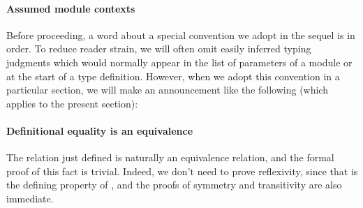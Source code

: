 \paragraph*{Assumed module contexts}
Before proceeding, a word about a special convention we adopt in the sequel is in order. To reduce reader strain, we will often omit easily inferred typing judgments which would normally appear in the list of parameters of a module or at the start of a type definition.  However, when we adopt this convention in a particular section, we will make an announcement like the following (which applies to the present section):


\paragraph*{Definitional equality is an equivalence}
The relation  just defined is naturally an equivalence relation, and the formal proof of this fact is trivial. Indeed, we don't need to prove reflexivity, since that is the defining property of , and the proofs of symmetry and transitivity are also immediate.
\ccpad
